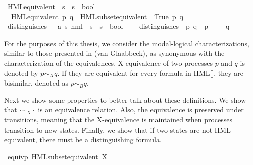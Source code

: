 \begin{isabellebody}
\isanewline
{}\isamarkupfalse%
\ HML{\isacharunderscore}{\kern0pt}equivalent\ {\isacharcolon}{\kern0pt}{\isacharcolon}{\kern0pt}\ {\isachardoublequoteopen}{\isacharprime}{\kern0pt}s\ {\isasymRightarrow}\ {\isacharprime}{\kern0pt}s\ {\isasymRightarrow}\ bool{\isachardoublequoteclose}\ \isanewline
\ \ {\isachardoublequoteopen}HML{\isacharunderscore}{\kern0pt}equivalent\ p\ q\ {\isasymequiv}\ HML{\isacharunderscore}{\kern0pt}subset{\isacharunderscore}{\kern0pt}equivalent\ {\isacharbraceleft}{\kern0pt}{\isasymphi}{\isachardot}{\kern0pt}\ True{\isacharbraceright}{\kern0pt}\ p\ q{\isachardoublequoteclose}\isanewline
\isanewline
{}\isamarkupfalse%
\ distinguishes\ {\isacharcolon}{\kern0pt}{\isacharcolon}{\kern0pt}\ \ {\isacartoucheopen}{\isacharparenleft}{\kern0pt}{\isacharprime}{\kern0pt}a{\isacharcomma}{\kern0pt}\ {\isacharprime}{\kern0pt}s{\isacharparenright}{\kern0pt}\ hml\ {\isasymRightarrow}\ {\isacharprime}{\kern0pt}s\ {\isasymRightarrow}\ {\isacharprime}{\kern0pt}s\ {\isasymRightarrow}\ bool{\isacartoucheclose}\ \isanewline
\ \ \ {\isacartoucheopen}distinguishes\ {\isasymphi}\ p\ q\ {\isasymequiv}\ p\ {\isasymTurnstile}\ {\isasymphi}\ {\isasymand}\ {\isasymnot}\ q\ {\isasymTurnstile}\ {\isasymphi}{\isacartoucheclose}%
\begin{isamarkuptext}%
For the purposes of this thesis, we consider the modal-logical characterizations, similar to those presented in (van Glaabbeck), as synonymous with the characterization of the equivalences.
\textnormal{X-equivalence} of two processes $p$ and $q$ is denoted by $p \sim_X q$. If they are equivalent for every formula in \textnormal{HML}[\Sigma], they are bisimilar, denoted as $p \sim_B q$.%
\end{isamarkuptext}\isamarkuptrue%
%
\begin{isamarkuptext}%
Next we show some properties to better talk about these definitions. We show that $\cdot \sim_X \cdot$ is an equivalence relation. 
Also, the equivalence is preserved under transitions, meaning that the X-equivalence is maintained when processes transition to new states.
Finally, we show that if two states are not HML equivalent, there must be a distinguishing formula.%
\end{isamarkuptext}\isamarkuptrue%
%
\isadelimvisible
%
\endisadelimvisible
%
\isatagvisible
%
\endisatagvisible
{\isafoldvisible}%
%
\isadelimvisible
\isanewline
%
\endisadelimvisible
{}\isamarkupfalse%
\ {\isacartoucheopen}equivp\ {\isacharparenleft}{\kern0pt}HML{\isacharunderscore}{\kern0pt}subset{\isacharunderscore}{\kern0pt}equivalent\ X{\isacharparenright}{\kern0pt}{\isacartoucheclose}\isanewline

\end{isabellebody}

